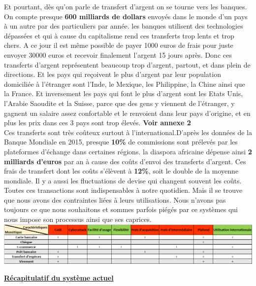 \documentclass[12pt]{report}
\begin{document}
\hspace{1cm} Et pourtant, dès qu'on parle de transfert d'argent on se tourne vers les banques. On compte presque \textbf{600 milliards de dollars} envoyés dans le monde d’un pays à un autre par des particuliers par année. les banques utilisent des technologies dépassées et qui à cause du capitalisme rend ces transferts trop lents et trop chers. A ce jour  il est même possible de payer 1000 euros de frais pour juste envoyer 30000 euros et recevoir finalement l'argent 15 jours après. Donc ces transferts d’argent représentent beaucoup trop d’argent, partout, et dans plein de directions. Et les pays qui reçoivent le plus d’argent par leur population domiciliée à l’étranger sont l’Inde, le Mexique, les Philippine, la Chine ainsi que la France. Et inversement les pays qui font le plus d'argent sont les Etats Unis, l’Arabie Saoudite et la Suisse, parce que des gens y viennent de l’étranger, y gagnent un salaire assez confortable et le renvoient dans leur pays d’origine, et en plus les prix dans ces 3 pays sont trop élevés. \textbf{Voir annexe 2}\\

\hspace{1cm}Ces transferts sont très coûteux surtout à l'international.D'après les données de la Banque Mondiale en 2015,  presque \textbf{10\%} de commissions sont prélevés par les plateformes d’échange dans certaines régions. la diaspora africaine dépense ainsi \textbf{2 milliards d'euros} par an à cause des coûts d'envoi des transferts d'argent. Ces frais de transfert dont les coûts s'élèvent à \textbf{12\%}, soit le double de la moyenne mondiale. Il y a aussi les fluctuations de devise qui changent souvent les coûts.\\

\hspace{1cm} Toutes ces transactions sont indispensables à notre quotidien. Mais il se trouve que nous avons des contraintes liées à leurs utilisations. Nous n'avons pas toujours ce que nous souhaitons et sommes parfois piégés par ce systèmes qui nous impose son processus ainsi que ses caprices.\\

\includegraphics[width=1\textwidth]{tableau_recap}
\begin{center}
   \textbf{\underline{Récapitulatif du système actuel}} \\[1cm]
\end{center}
\end{document}
